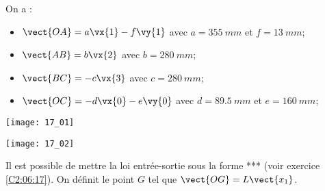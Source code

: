 \normalfalse \difficilefalse \tdifficiletrue
\correctionfalse


\setcounter{question}{0}%
\ifcorrection
\else
{}
\fi

\ifprof
\else
On a : 
\begin{itemize}
\item $\vect{OA} = a \vx{1}-f \vy{1}$ avec $a=\SI{355}{mm}$ et $f=\SI{13}{mm}$;
\item $\vect{AB} = b \vx{2}$ avec $b=\SI{280}{mm}$;
\item $\vect{BC} = -c \vx{3}$ avec $c=\SI{280}{mm}$;
\item $\vect{OC} = -d \vx{0}-e\vy{0}$ avec $d=\SI{89,5}{mm}$ et $e=\SI{160}{mm}$;
\end{itemize}

\begin{marginfigure}
\texttt{[image: 17\_01]}

\texttt{[image: 17\_02]}
\end{marginfigure}
\fi
Il est possible de mettre la loi entrée-sortie sous la forme *** (voir exercice \ref{C2:06:17}).
On définit le point $G$ tel que $\vect{OG}=L\vect{x_1}$.

\ifprof
\else
\fi

\ifprof
\else
\fi

\ifprof
\else


\fi